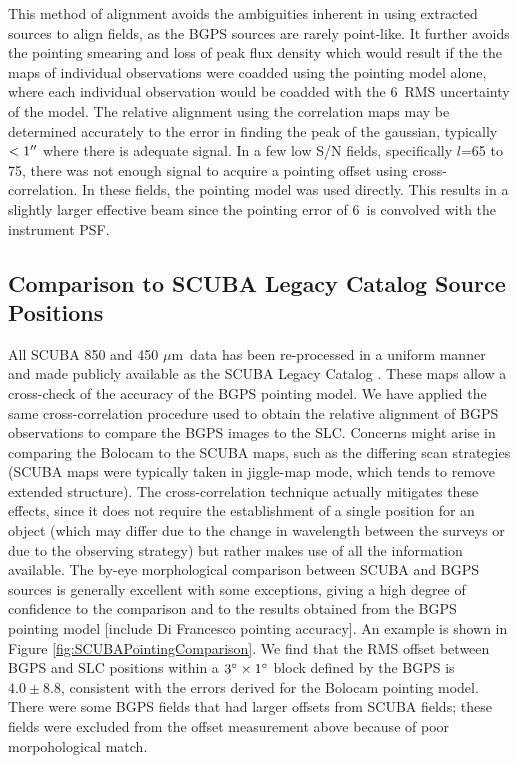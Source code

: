 \documentclass{emulateapj}
\newcommand{\mum}{\ensuremath{\mu \mathrm{m}}}
\newcommand{\lon}{\ensuremath{l}}
\begin{document}
This method of alignment avoids the ambiguities inherent in using
extracted sources to align fields, as the BGPS sources are rarely
point-like.  It further avoids the pointing smearing and loss of peak
flux density which would result if the the maps of individual
observations were coadded using the pointing model alone, where each
individual observation would be coadded with the 6\arcsec\ RMS
uncertainty of the model.  The relative alignment using the
correlation maps may be determined accurately to the error in finding
the peak of the gaussian, typically $<1\mbox{$^{\prime\prime}$}$ where there is
adequate signal.  In a few low S/N fields, specifically \lon=65 to 75,
there was not enough signal to acquire a pointing offset using
cross-correlation.  In these fields, the pointing model was used
directly.  This results in a slightly larger effective beam since the
pointing error of 6\arcsec\ is convolved with the instrument PSF.

\subsection{Comparison to SCUBA Legacy Catalog Source Positions}
\label{sec:SCUBAPointingComparison}

All SCUBA 850 and 450 \mum\ data has been re-processed in a uniform
manner and made publicly available as the SCUBA Legacy Catalog
\citep[][hereafter SLC]{difrancesco08}.  These maps allow a
cross-check of the accuracy of the BGPS pointing model.  We have
applied the same cross-correlation procedure used to obtain the
relative alignment of BGPS observations to compare the BGPS images to
the SLC.  Concerns might arise in comparing the Bolocam to the SCUBA
maps, such as the differing scan strategies (SCUBA maps were typically
taken in jiggle-map mode, which tends to remove extended structure).
The cross-correlation technique actually mitigates these effects,
since it does not require the establishment of a single position for
an object (which may differ due to the change in wavelength between
the surveys or due to the observing strategy) but rather makes use of
all the information available.  The by-eye morphological comparison
between SCUBA and BGPS sources is generally excellent with some
exceptions, giving a high degree of confidence to the comparison and
to the results obtained from the BGPS pointing model [include Di
Francesco pointing accuracy].  An example is shown in Figure
\ref{fig:SCUBAPointingComparison}.  We find that the RMS offset
between BGPS and SLC positions within a $3\mbox{$^\circ$} \times 1\mbox{$^\circ$}$
block defined by the BGPS is $4.0\pm8.8$\arcsec, consistent with the
errors derived for the Bolocam pointing model.  There were some BGPS
fields that had larger offsets from SCUBA fields; these fields were
excluded from the offset measurement above because of poor
morpohological match.
\end{document}
